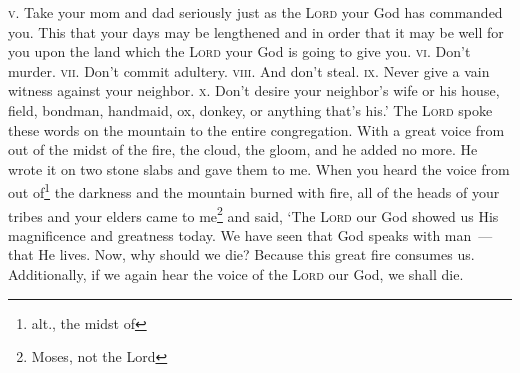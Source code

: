 \begin{enumerate*}[mode=unboxed]
     \textsc{v.} Take your mom and dad seriously just as the \textsc{Lord} your God has commanded you. This that your days may be lengthened and in order that it may be well for you upon the land which the \textsc{Lord} your God is going to give you.%
     \textsc{vi.} Don't murder.%
     \textsc{vii.} Don't commit adultery.%
     \textsc{viii.} And don't steal.%
     \textsc{ix.} Never give a vain witness against your neighbor.%
     \textsc{x.} Don't desire your neighbor's wife or his house, field, bondman, handmaid, ox, donkey, or anything that's his.'%
     The \textsc{Lord} spoke these words on the mountain to the entire congregation. With a great voice from out of the midst of the fire, the cloud, the gloom, and he added no more. He wrote it on two stone slabs and gave them to me.%
     When you heard the voice from out of\footnote{alt., the midst of} the darkness and the mountain burned with fire, all of the heads of your tribes and your elders came to me\footnote{Moses, not the Lord}%
     and said, `The \textsc{Lord} our God showed us His magnificence and greatness today. We have seen that God speaks with man~--- that He lives.%
     Now, why should we die? Because this great fire consumes us. Additionally, if we again hear the voice of the \textsc{Lord} our God, we shall die.%
\end{enumerate*}
